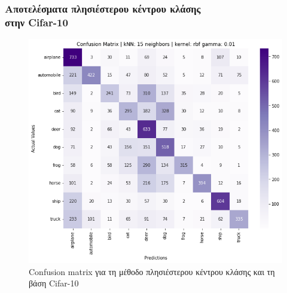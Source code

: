 \documentclass{beamer}
\begin{document}
\begin{frame}
\frametitle{Αποτελέσματα πλησιέστερου κέντρου κλάσης\\στην Cifar-10}

\begin{figure}[H]
    \centering
    \includegraphics[width=0.6\linewidth]{cifar/confusion_matrix_knn.png}
    \caption{Confusion matrix για τη μέθοδο πλησιέστερου κέντρου κλάσης και τη
    βάση Cifar-10}
    \label{fig:cifar_confusion_nc}
\end{figure}

\end{frame}
\end{document}
